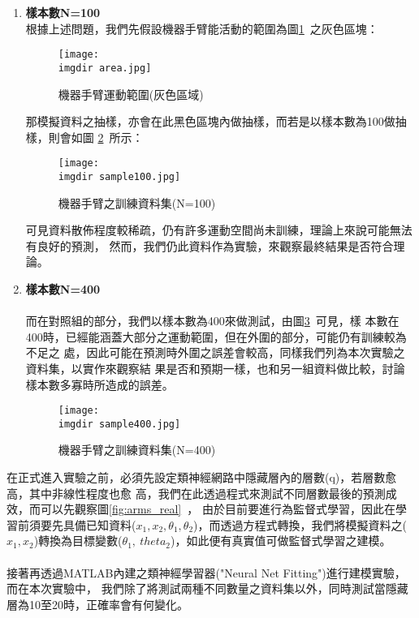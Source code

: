         \begin{enumerate}        	
        	\item {\textbf{樣本數N=100}\\
        		根據上述問題，我們先假設機器手臂能活動的範圍為圖\ref{fig:area}\ 之灰色區塊：
        		\begin{figure}[H]	
					\centering	 			 	 
   					\texttt{[image: \\imgdir area.jpg]} 
   					\caption{機器手臂運動範圍(灰色區域)}
   					\label{fig:area}   			 		 
				\end{figure}
        		那模擬資料之抽樣，亦會在此黑色區塊內做抽樣，而若是以樣本數為100做抽樣，則會如圖					\ref{fig:sample100}\ 所示：
        		\begin{figure}[H]	
					\centering	 			 	 
   					\texttt{[image: \\imgdir sample100.jpg]} 
   					\caption{機器手臂之訓練資料集(N=100)}
   					\label{fig:sample100}   			 		 
				\end{figure}
				可見資料散佈程度較稀疏，仍有許多運動空間尚未訓練，理論上來說可能無法有良好的預測，					然而，我們仍此資料作為實驗，來觀察最終結果是否符合理論。        	
        	}
        	\item {\textbf{樣本數N=400}\\
        	\\
        		而在對照組的部分，我們以樣本數為400來做測試，由圖\ref{fig:sample400}\ 可見，樣					本數在400時，已經能涵蓋大部分之運動範圍，但在外圍的部分，可能仍有訓練較為不足之					處，因此可能在預測時外圍之誤差會較高，同樣我們列為本次實驗之資料集，以實作來觀察結					果是否和預期一樣，也和另一組資料做比較，討論樣本數多寡時所造成的誤差。
        		\begin{figure}[H]	
					\centering	 			 	 
   					\texttt{[image: \\imgdir sample400.jpg]} 
   					\caption{機器手臂之訓練資料集(N=400)}
   					\label{fig:sample400}   			 		 
				\end{figure}
        	}
        \end{enumerate}        
        在正式進入實驗之前，必須先設定類神經網路中隱藏層內的層數(q)，若層數愈高，其中非線性程度也愈			高，我們在此透過程式來測試不同層數最後的預測成效，而可以先觀察圖\ref{fig:arms_real}\ ，			由於目前要進行為監督式學習，因此在學習前須要先具備已知資料($x_1,x_2,\theta_1 ,					\theta_2$)，而透過方程式轉換，我們將模擬資料之($x_1,x_2$)轉換為目標變數($\theta_1,\				theta_2$)，如此便有真實值可做監督式學習之建模。
        \\
        \\
        接著再透過MATLAB內建之類神經學習器("Neural Net Fitting")進行建模實驗，而在本次實驗中，			我們除了將測試兩種不同數量之資料集以外，同時測試當隱藏層為10至20時，正確率會有何變化。        
        
